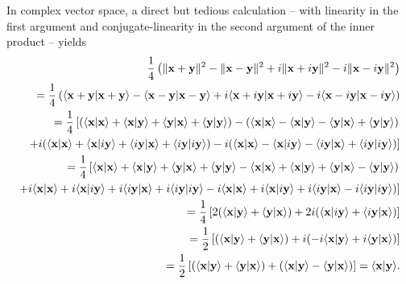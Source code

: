 {\color{OliveGreen}
\bproof
In complex vector space,  a direct but tedious calculation
-- with linearity in the first argument and conjugate-linearity in the second argument of the inner product -- yields
\begin{equation}
\begin{split}
\frac{1}{4}\left(
\|  {\bf x}+ {\bf y} \|^2
-
\|  {\bf x}- {\bf y} \|^2
+ i
\|  {\bf x}+ i{\bf y} \|^2
- i
\|  {\bf x}- i{\bf y} \|^2
\right)
\\
=
\frac{1}{4}\left(
\langle {\bf x}+ {\bf y} \vert {\bf x}+ {\bf y}\rangle
-
\langle {\bf x}- {\bf y} \vert {\bf x}- {\bf y}\rangle
+ i
\langle {\bf x}+ i{\bf y} \vert {\bf x}+ i{\bf y}\rangle
- i
\langle {\bf x}- i{\bf y} \vert {\bf x} -i {\bf y}\rangle
\right)
\\
=
\frac{1}{4}\left[
(
\langle {\bf x} \vert {\bf x}\rangle +
\langle {\bf x} \vert {\bf y}\rangle +
\langle {\bf y} \vert  {\bf x}\rangle +
\langle {\bf y} \vert {\bf y}\rangle
)
-
(
\langle {\bf x} \vert {\bf x}\rangle    -
\langle {\bf x} \vert {\bf y}\rangle    -
\langle {\bf y} \vert {\bf x}\rangle    +
\langle {\bf y} \vert {\bf y}\rangle
)
\right.
\\
\left.
+ i
(
\langle {\bf x} \vert {\bf x}\rangle +
\langle {\bf x} \vert  i{\bf y}\rangle  +
\langle i{\bf y} \vert {\bf x}\rangle   +
\langle i{\bf y} \vert i{\bf y}\rangle
)
- i
(
\langle {\bf x} \vert {\bf x}\rangle -
\langle {\bf x} \vert i {\bf y}\rangle  -
\langle i{\bf y} \vert {\bf x}\rangle  +
\langle  i{\bf y} \vert i {\bf y}\rangle
)
\right]
\\
=
\frac{1}{4}\left[
\langle {\bf x} \vert {\bf x}\rangle +
\langle {\bf x} \vert {\bf y}\rangle +
\langle {\bf y} \vert  {\bf x}\rangle +
\langle {\bf y} \vert {\bf y}\rangle
-
\langle {\bf x} \vert {\bf x}\rangle    +
\langle {\bf x} \vert {\bf y}\rangle    +
\langle {\bf y} \vert {\bf x}\rangle    -
\langle {\bf y} \vert {\bf y}\rangle
)
\right.
\\
\left.
+
i \langle {\bf x} \vert {\bf x}\rangle +
i\langle {\bf x} \vert  i{\bf y}\rangle  +
i\langle i{\bf y} \vert {\bf x}\rangle   +
i\langle i{\bf y} \vert i{\bf y}\rangle
-
i\langle {\bf x} \vert {\bf x}\rangle +
i\langle {\bf x} \vert i {\bf y}\rangle +
i\langle i{\bf y} \vert {\bf x}\rangle  -
i\langle  i{\bf y} \vert i {\bf y}\rangle
)
\right]
\\
=
\frac{1}{4}\left[
2 (
\langle {\bf x} \vert {\bf y}\rangle +
\langle {\bf y} \vert  {\bf x}\rangle
)
+2 i (
\langle {\bf x} \vert  i{\bf y}\rangle  +
\langle i{\bf y} \vert {\bf x}\rangle
)
\right]
\\
=
\frac{1}{2}\left[
(
\langle {\bf x} \vert {\bf y}\rangle +
\langle {\bf y} \vert  {\bf x}\rangle
)
+ i (
-i\langle {\bf x} \vert  {\bf y}\rangle  +
i\langle {\bf y} \vert {\bf x}\rangle
)
\right]
\\
=
\frac{1}{2}\left[
(
\langle {\bf x} \vert {\bf y}\rangle +
\langle {\bf y} \vert  {\bf x}\rangle
)
+  (
\langle {\bf x} \vert  {\bf y}\rangle
-\langle {\bf y} \vert {\bf x}\rangle
)
\right]
=
\langle {\bf x} \vert {\bf y}\rangle
.
\end{split}
\label{2015-m-ch-polidc2}
\end{equation}
\eproof
}



